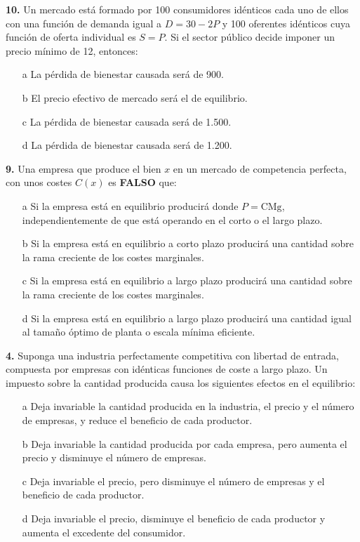 \documentclass{nuevotema}
\begin{document}
\textbf{10.} Un mercado está formado por 100 consumidores idénticos cada uno de ellos con una función de demanda igual a $D=30-2P$ y 100 oferentes idénticos cuya función de oferta individual es $S=P$. Si el sector público decide imponer un precio mínimo de 12, entonces:

\begin{itemize}
	\item[a] La pérdida de bienestar causada será de 900.
	\item[b] El precio efectivo de mercado será el de equilibrio.
	\item[c] La pérdida de bienestar causada será de 1.500.
	\item[d] La pérdida de bienestar causada será de 1.200.
\end{itemize}


\textbf{9.} Una empresa que produce el bien $x$ en un mercado de competencia perfecta, con unos costes $C(x)$ es \textbf{FALSO} que:
\begin{enumerate}
	\item[a] Si la empresa está en equilibrio producirá donde $P=\text{CMg}$, independientemente de que está operando en el corto o el largo plazo.
	\item[b] Si la empresa está en equilibrio a corto plazo producirá una cantidad sobre la rama creciente de los costes marginales.
	\item[c] Si la empresa está en equilibrio a largo plazo producirá una cantidad sobre la rama creciente de los costes marginales.
	\item[d] Si la empresa está en equilibrio a largo plazo producirá una cantidad igual al tamaño óptimo de planta o escala mínima eficiente.
\end{enumerate}


\textbf{4.} Suponga una industria perfectamente competitiva con libertad de entrada, compuesta por empresas con idénticas funciones de coste a largo plazo. Un impuesto sobre la cantidad producida causa los siguientes efectos en el equilibrio:

\begin{itemize}
	\item[a] Deja invariable la cantidad producida en la industria, el precio y el número de empresas, y reduce el beneficio de cada productor.
	\item[b] Deja invariable la cantidad producida por cada empresa, pero aumenta el precio y disminuye el número de empresas.
	\item[c] Deja invariable el precio, pero disminuye el número de empresas y el beneficio de cada productor.
	\item[d] Deja invariable el precio, disminuye el beneficio de cada productor y aumenta el excedente del consumidor.
\end{itemize}
\end{document}
